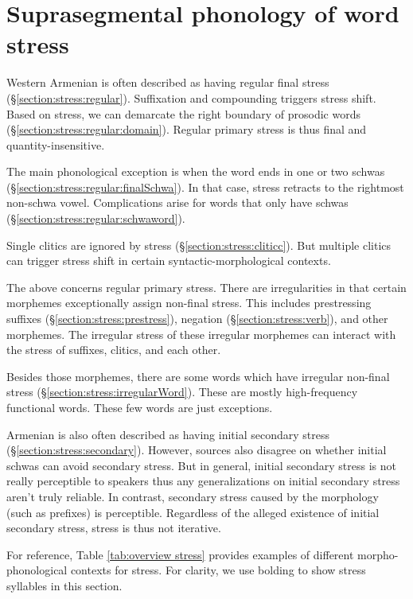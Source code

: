  \chapter{Suprasegmental phonology of word stress}\label{chapter:stress}

Western Armenian is often described as having regular final stress (\S\ref{section:stress:regular}). Suffixation and compounding triggers stress shift.  Based on stress, we can demarcate the right boundary of prosodic words (\S\ref{section:stress:regular:domain}). Regular primary stress is thus final and  quantity-insensitive. 



The main phonological exception is when the word ends in one or two schwas (\S\ref{section:stress:regular:finalSchwa}). In that case, stress retracts to the rightmost non-schwa vowel. Complications arise for words that only have schwas (\S\ref{section:stress:regular:schwaword}). 

Single   clitics are ignored by stress (\S\ref{section:stress:cliticc}). But multiple clitics can trigger stress shift in certain syntactic-morphological contexts. 


The above concerns regular primary stress. There are irregularities in that certain morphemes exceptionally assign non-final stress. This includes  prestressing suffixes (\S\ref{section:stress:prestress}), negation (\S\ref{section:stress:verb}), and other morphemes. The irregular stress of these irregular morphemes can interact with the stress of suffixes, clitics, and each other. 

Besides those morphemes, there are some words which have irregular non-final stress (\S\ref{section:stress:irregularWord}). These are mostly high-frequency functional words. These few words are just exceptions.

Armenian is also often described as having initial secondary stress (\S\ref{section:stress:secondary}). However, sources also disagree on whether initial schwas can avoid secondary stress.  But in general,  initial secondary stress is not really perceptible to speakers thus any generalizations on initial secondary stress aren't truly reliable. In contrast, secondary stress caused by the morphology (such as prefixes) is perceptible. Regardless of the alleged existence of initial secondary stress, stress is thus not iterative. 

For reference, Table \ref{tab:overview stress} provides examples of different morpho-phonological contexts for stress.
For clarity, we use bolding to show stress syllables in this section. 

